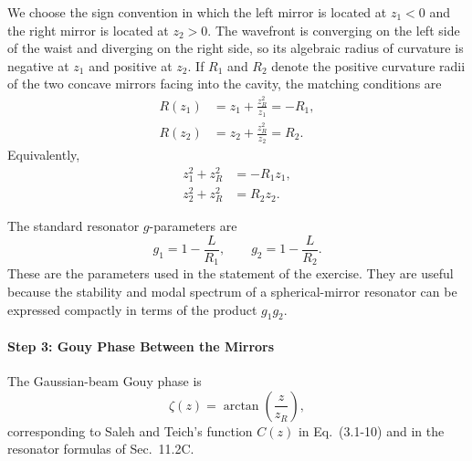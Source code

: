\begin{resolucao}[Solution]
        We choose the sign convention in which the left mirror is located at $z_1<0$ and the right mirror is located at $z_2>0$. The wavefront is converging on the left side of the waist and diverging on the right side, so its algebraic radius of curvature is negative at $z_1$ and positive at $z_2$. If $R_1$ and $R_2$ denote the positive curvature radii of the two concave mirrors facing into the cavity, the matching conditions are
        \begin{align}
            R(z_1)
            &=
            z_1+\frac{z_R^2}{z_1}
            =
            -R_1,
            \label{eq:left_mirror_match}
            \\
            R(z_2)
            &=
            z_2+\frac{z_R^2}{z_2}
            =
            R_2.
            \label{eq:right_mirror_match}
        \end{align}
        Equivalently,
        \begin{align}
            z_1^2+z_R^2
            &=
            -R_1z_1,
            \label{eq:left_mirror_relation}
            \\
            z_2^2+z_R^2
            &=
            R_2z_2.
            \label{eq:right_mirror_relation}
        \end{align}

        The standard resonator $g$-parameters are
        \begin{equation}
            g_1=1-\frac{L}{R_1},
            \qquad
            g_2=1-\frac{L}{R_2}.
            \label{eq:g_parameters}
        \end{equation}
        These are the parameters used in the statement of the exercise. They are useful because the stability and modal spectrum of a spherical-mirror resonator can be expressed compactly in terms of the product $g_1g_2$.

    \paragraph*{Step 3: Gouy Phase Between the Mirrors}
        The Gaussian-beam Gouy phase is
        \begin{equation}
            \zeta(z)
            =
            \arctan\left(\frac{z}{z_R}\right),
            \label{eq:gouy_phase}
        \end{equation}
        corresponding to Saleh and Teich's function $C(z)$ in Eq.~(3.1-10) and in the resonator formulas of Sec.~11.2C.


\end{resolucao}
